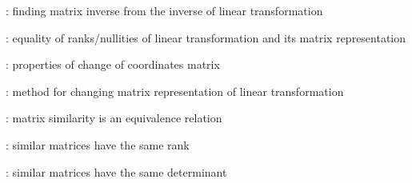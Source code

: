 \item {}: finding matrix inverse from the inverse of linear transformation
\item {}: equality of ranks/nullities of
linear transformation and its matrix representation
\item {}: properties of change of coordinates matrix
\item {}: method for changing matrix representation of linear transformation
\item {}: matrix similarity is an equivalence relation
\item {}: similar matrices have the same rank
\item {}: similar matrices have the same determinant


